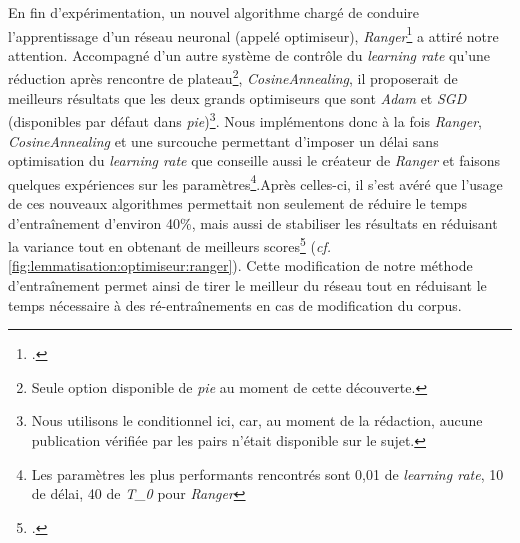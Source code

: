 En fin d'expérimentation, un nouvel algorithme chargé de conduire l'apprentissage d'un réseau neuronal (appelé optimiseur), \textit{Ranger}\footcite{wright_new_2019} a attiré notre attention. Accompagné d'un autre système de contrôle du \textit{learning rate} qu'une réduction après rencontre de plateau\footnote{Seule option disponible de \textit{pie} au moment de cette découverte.}, \textit{CosineAnnealing}, il proposerait de meilleurs résultats que les deux grands optimiseurs que sont \textit{Adam} et \textit{SGD} (disponibles par défaut dans \textit{pie})\footnote{Nous utilisons le conditionnel ici, car, au moment de la rédaction, aucune publication vérifiée par les pairs n'était disponible sur le sujet.}. Nous implémentons donc à la fois \textit{Ranger}, \textit{CosineAnnealing} et une surcouche permettant d'imposer un délai sans optimisation du \textit{learning rate} que conseille aussi le créateur de \textit{Ranger} et faisons quelques expériences sur les paramètres\footnote{Les paramètres les plus performants rencontrés sont 0,01 de \textit{learning rate}, 10 de délai, 40 de \textit{T\_0} pour \textit{Ranger}}.Après celles-ci, il s'est avéré que l'usage de ces nouveaux algorithmes permettait non seulement de réduire le temps d'entraînement d'environ 40\%, mais aussi de stabiliser les résultats en réduisant la variance tout en obtenant de meilleurs scores\footcite{clerice_allow_nodate} (\textit{cf.} \ref{fig:lemmatisation:optimiseur:ranger}). Cette modification de notre méthode d'entraînement permet ainsi de tirer le meilleur du réseau tout en réduisant le temps nécessaire à des ré-entraînements en cas de modification du corpus.


